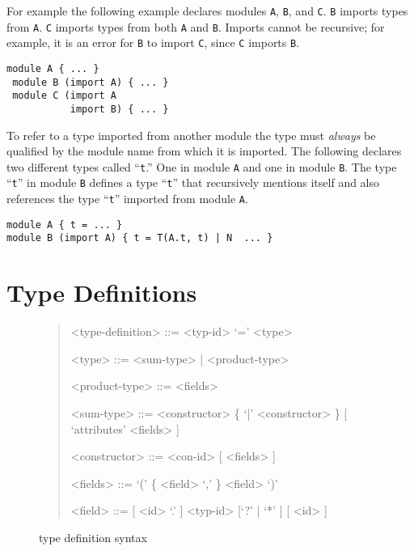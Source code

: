 For example the
following example declares modules \lstinline[language=ASDL]!A!,
\lstinline[language=ASDL]!B!, and \lstinline[language=ASDL]!C!.
\lstinline[language=ASDL]!B! imports types from \lstinline[language=ASDL]!A!.
\lstinline[language=ASDL]!C! imports types from both \lstinline[language=ASDL]!A! and
\lstinline[language=ASDL]!B!.
Imports cannot be recursive; for example, it is an error for \lstinline[language=ASDL]!B! to
import \lstinline[language=ASDL]!C!, since \lstinline[language=ASDL]!C!
imports \lstinline[language=ASDL]!B!.
\begin{code}\begin{lstlisting}[language=ASDL]
 module A { ... } 
 module B (import A) { ... }
 module C (import A 
           import B) { ... }
\end{lstlisting}\end{code}%

To refer to a type imported from another module the type must
\emph{always} be qualified by the module name from which it is
imported.
The following declares two different types called ``\texttt{t}.''
One in module \texttt{A} and one in module \texttt{B}.
The type ``\texttt{t}'' in module \texttt{B} defines a type ``\texttt{t}'' that
recursively mentions itself and also references the type ``\texttt{t}'' imported
from module \texttt{A}.
\begin{code}\begin{lstlisting}[language=ASDL]
module A { t = ... } 
module B (import A) { t = T(A.t, t) | N  ... }
\end{lstlisting}\end{code}%

\section{Type Definitions}

\begin{figure}[t]
  \begin{quote}
    \begin{grammar}
      <type-definition>  ::=  <typ-id> `=' <type>

      <type>         ::= <sum-type> | <product-type>

      <product-type> ::= <fields>

      <sum-type>     ::= <constructor> \{ `|' <constructor> \} [ `attributes' <fields> ]

      <constructor>  ::= <con-id> [ <fields> ]

      <fields>       ::= `(' \{ <field>  `,' \} <field> `)'

      <field>        ::= [ <id> `.' ] <typ-id> [`?' | `*' ]  [ <id> ]
    \end{grammar}
  \end{quote}
  \caption{\asdl{} type definition syntax}
  \label{fig:type-syntax}
\end{figure}%

